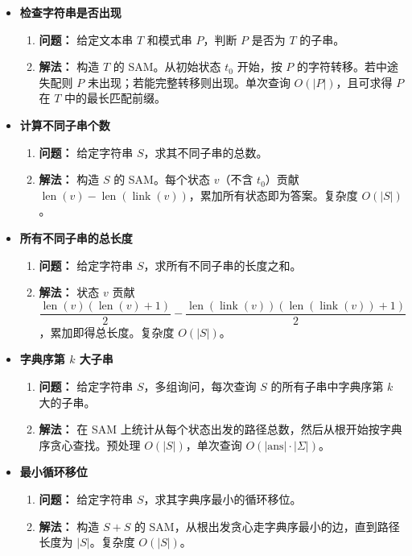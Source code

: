 \begin{itemize}
    \item \textbf{检查字符串是否出现}
    \begin{enumerate}
        \item \textbf{问题：} 给定文本串 $T$ 和模式串 $P$，判断 $P$ 是否为 $T$ 的子串。
        \item \textbf{解法：} 构造 $T$ 的 SAM。从初始状态 $t_0$ 开始，按 $P$ 的字符转移。若中途失配则 $P$ 未出现；若能完整转移则出现。单次查询 $O(|P|)$，且可求得 $P$ 在 $T$ 中的最长匹配前缀。
    \end{enumerate}

    \item \textbf{计算不同子串个数}
    \begin{enumerate}
        \item \textbf{问题：} 给定字符串 $S$，求其不同子串的总数。
        \item \textbf{解法：} 构造 $S$ 的 SAM。每个状态 $v$（不含 $t_0$）贡献 $\operatorname{len}(v)-\operatorname{len}(\operatorname{link}(v))$，累加所有状态即为答案。复杂度 $O(|S|)$。
    \end{enumerate}

    \item \textbf{所有不同子串的总长度}
    \begin{enumerate}
        \item \textbf{问题：} 给定字符串 $S$，求所有不同子串的长度之和。
        \item \textbf{解法：} 状态 $v$ 贡献 $\dfrac{\operatorname{len}(v)(\operatorname{len}(v)+1)}{2} - \dfrac{\operatorname{len}(\operatorname{link}(v))(\operatorname{len}(\operatorname{link}(v))+1)}{2}$，累加即得总长度。复杂度 $O(|S|)$。
    \end{enumerate}

    \item \textbf{字典序第 $k$ 大子串}
    \begin{enumerate}
        \item \textbf{问题：} 给定字符串 $S$，多组询问，每次查询 $S$ 的所有子串中字典序第 $k$ 大的子串。
        \item \textbf{解法：} 在 SAM 上统计从每个状态出发的路径总数，然后从根开始按字典序贪心查找。预处理 $O(|S|)$，单次查询 $O(|\text{ans}|\cdot|\Sigma|)$。
    \end{enumerate}

    \item \textbf{最小循环移位}
    \begin{enumerate}
        \item \textbf{问题：} 给定字符串 $S$，求其字典序最小的循环移位。
        \item \textbf{解法：} 构造 $S+S$ 的 SAM，从根出发贪心走字典序最小的边，直到路径长度为 $|S|$。复杂度 $O(|S|)$。
    \end{enumerate}


\end{itemize}
